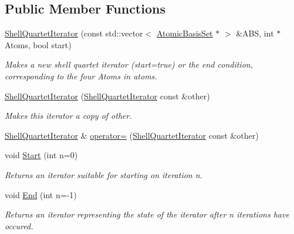 \subsection*{Public Member Functions}
\begin{DoxyCompactItemize}
\item 
\hyperlink{classJKBuilder_1_1ShellQuartetIterator_a2b20876856cd8912d9fba4c28428175a}{ShellQuartetIterator} (const std::vector$<$ \hyperlink{classJKBuilder_1_1AtomicBasisSet}{AtomicBasisSet} $\ast$ $>$ \&ABS, int $\ast$Atoms, bool start)
\begin{DoxyCompactList}\small\item\em Makes a new shell quartet iterator (start=true) or the end condition, corresponding to the four Atoms in atoms. \item\end{DoxyCompactList}\item 
\hyperlink{classJKBuilder_1_1ShellQuartetIterator_a6a14b77cf2a987250aa1d25c4e6482a5}{ShellQuartetIterator} (\hyperlink{classJKBuilder_1_1ShellQuartetIterator}{ShellQuartetIterator} const \&other)
\begin{DoxyCompactList}\small\item\em Makes this iterator a copy of other. \item\end{DoxyCompactList}\item 
\hyperlink{classJKBuilder_1_1ShellQuartetIterator}{ShellQuartetIterator} \& \hyperlink{classJKBuilder_1_1ShellQuartetIterator_acd8ac6ed2e831bcb87e65acc0de747db}{operator=} (\hyperlink{classJKBuilder_1_1ShellQuartetIterator}{ShellQuartetIterator} const \&other)
\item 
void \hyperlink{classJKBuilder_1_1QuartetIterator_a34ca36a99b20ae3170babadaffe51ed2}{Start} (int n=0)
\begin{DoxyCompactList}\small\item\em Returns an iterator suitable for starting on iteration n. \item\end{DoxyCompactList}\item 
void \hyperlink{classJKBuilder_1_1QuartetIterator_a5f692b73d2e160450f4617bb75825e11}{End} (int n=-\/1)
\begin{DoxyCompactList}\small\item\em Returns an iterator representing the state of the iterator after n iterations have occured. \item\end{DoxyCompactList}\item 

\end{DoxyCompactItemize}
